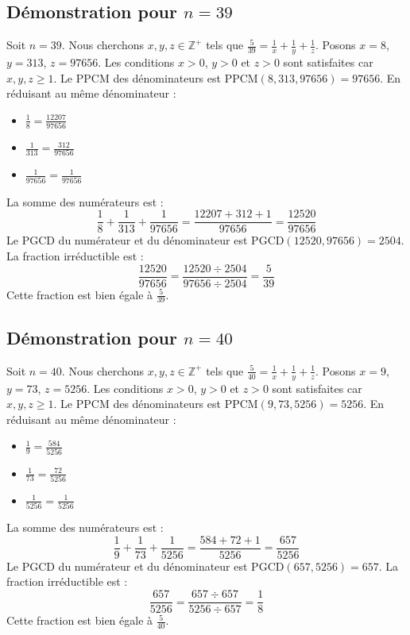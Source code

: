 \documentclass[11pt,a4paper]{article}
\begin{document}
\subsection{Démonstration pour $n = 39$}
Soit $n = 39$. Nous cherchons $x, y, z \in \mathbb{Z}^{+}$ tels que $\frac{5}{39} = \frac{1}{x} + \frac{1}{y} + \frac{1}{z}$.
Posons $x = 8$, $y = 313$, $z = 97656$.
Les conditions $x > 0$, $y > 0$ et $z > 0$ sont satisfaites car $x, y, z \geq 1$.
Le PPCM des dénominateurs est $\text{PPCM}(8, 313, 97656) = 97656$.
En réduisant au même dénominateur :
\begin{itemize}
    \item $\frac{1}{8} = \frac{12207}{97656}$
    \item $\frac{1}{313} = \frac{312}{97656}$
    \item $\frac{1}{97656} = \frac{1}{97656}$
\end{itemize}
La somme des numérateurs est :
$$ \frac{1}{8} + \frac{1}{313} + \frac{1}{97656} = \frac{12207 + 312 + 1}{97656} = \frac{12520}{97656} $$
Le PGCD du numérateur et du dénominateur est $\text{PGCD}(12520, 97656) = 2504$.
La fraction irréductible est :
$$ \frac{12520}{97656} = \frac{12520 \div 2504}{97656 \div 2504} = \frac{5}{39} $$
Cette fraction est bien égale à $\frac{5}{39}$.

\subsection{Démonstration pour $n = 40$}
Soit $n = 40$. Nous cherchons $x, y, z \in \mathbb{Z}^{+}$ tels que $\frac{5}{40} = \frac{1}{x} + \frac{1}{y} + \frac{1}{z}$.
Posons $x = 9$, $y = 73$, $z = 5256$.
Les conditions $x > 0$, $y > 0$ et $z > 0$ sont satisfaites car $x, y, z \geq 1$.
Le PPCM des dénominateurs est $\text{PPCM}(9, 73, 5256) = 5256$.
En réduisant au même dénominateur :
\begin{itemize}
    \item $\frac{1}{9} = \frac{584}{5256}$
    \item $\frac{1}{73} = \frac{72}{5256}$
    \item $\frac{1}{5256} = \frac{1}{5256}$
\end{itemize}
La somme des numérateurs est :
$$ \frac{1}{9} + \frac{1}{73} + \frac{1}{5256} = \frac{584 + 72 + 1}{5256} = \frac{657}{5256} $$
Le PGCD du numérateur et du dénominateur est $\text{PGCD}(657, 5256) = 657$.
La fraction irréductible est :
$$ \frac{657}{5256} = \frac{657 \div 657}{5256 \div 657} = \frac{1}{8} $$
Cette fraction est bien égale à $\frac{5}{40}$.
\end{document}
